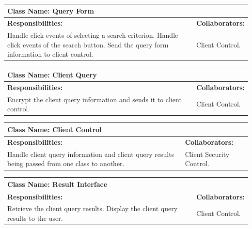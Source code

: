 \documentclass[]{article}
\begin{document}
\begin{enumerate}[a)]
\begin{table}[ht]
		\centering
		\begin{tabular}{|p{5cm}|p{5cm}|}
		\hline 
		 \multicolumn{2}{|l|}{\textbf{Class Name: Query Form}} \\
		\hline
		\textbf{Responsibilities: } & \textbf{Collaborators:} \\
		\hline
		Handle click events of selecting a search criterion. Handle click events of the search button. Send the query form information to client control.	
		\vspace{1in} & Client Control.\\
		
		\hline				
		\end{tabular}
	\end{table}


\begin{table}[ht]
		\centering
		\begin{tabular}{|p{5cm}|p{5cm}|}
		\hline 
		 \multicolumn{2}{|l|}{\textbf{Class Name: Client Query}} \\
		\hline
		\textbf{Responsibilities: } & \textbf{Collaborators:} \\
		\hline
		Encrypt the client query information and sends it to client control.
		\vspace{1in} & Client Control.\\
		
		\hline				
		\end{tabular}
	\end{table}

\begin{table}[ht]
		\centering
		\begin{tabular}{|p{5cm}|p{5cm}|}
		\hline 
		 \multicolumn{2}{|l|}{\textbf{Class Name: Client Control}} \\
		\hline
		\textbf{Responsibilities: } & \textbf{Collaborators:} \\
		\hline
		Handle client query information and client query results being passed from one class to another.	
		\vspace{1in} & Client Security Control.\\
		
		\hline				
		\end{tabular}
	\end{table}

\begin{table}[ht]
		\centering
		\begin{tabular}{|p{5cm}|p{5cm}|}
		\hline 
		 \multicolumn{2}{|l|}{\textbf{Class Name: Result Interface}} \\
		\hline
		\textbf{Responsibilities: } & \textbf{Collaborators:} \\
		\hline
		Retrieve the client query results. Display the client query results to the user.
		\vspace{1in} & Client Control.\\
		

\end{tabular}
\end{table}
\end{enumerate}
\end{document}
